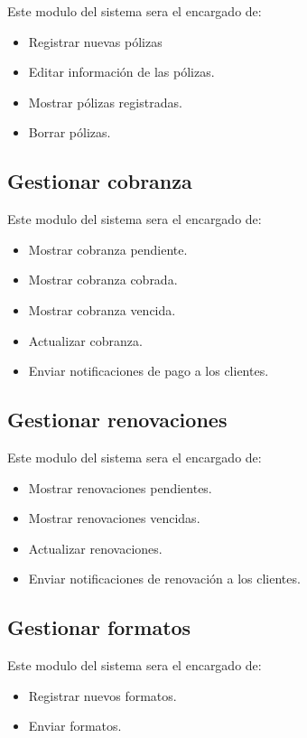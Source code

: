 Este modulo del sistema sera el encargado de:
\begin{itemize}
	\item Registrar nuevas pólizas
	\item Editar información de las pólizas.
	\item Mostrar pólizas registradas.
	\item Borrar pólizas.
\end{itemize}

\subsection*{Gestionar cobranza}

Este modulo del sistema sera el encargado de:
\begin{itemize}
	\item Mostrar cobranza pendiente.
	\item Mostrar cobranza cobrada.
	\item Mostrar cobranza vencida.
	\item Actualizar cobranza.
	\item Enviar notificaciones de pago a los clientes.
\end{itemize}

\subsection*{Gestionar renovaciones}

Este modulo del sistema sera el encargado de:
\begin{itemize}
	\item Mostrar renovaciones pendientes.
	\item Mostrar renovaciones vencidas.
	\item Actualizar renovaciones.
	\item Enviar notificaciones de renovación a los clientes.
\end{itemize}

\subsection*{Gestionar formatos}

Este modulo del sistema sera el encargado de:
\begin{itemize}
	\item Registrar nuevos formatos.
	\item Enviar formatos.
\end{itemize}

